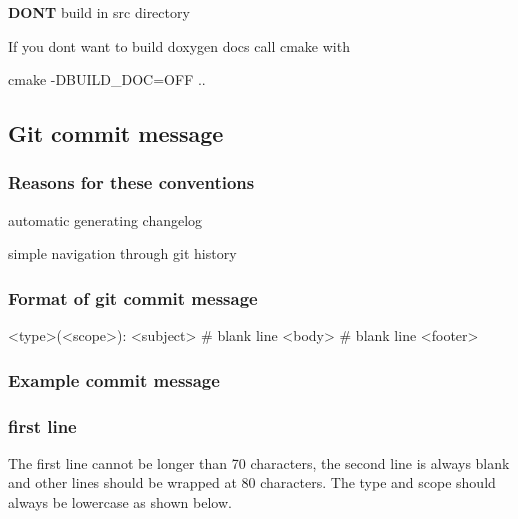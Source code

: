 {\bfseries D\+O\+NT} build in {\ttfamily src} directory
\begin{DoxyItemize}
\item If you dont want to build {\ttfamily doxygen docs} call cmake with
\end{DoxyItemize}


\begin{DoxyCode}
cmake -DBUILD\_DOC=OFF ..
\end{DoxyCode}


\subsection*{Git commit message}

\subsubsection*{Reasons for these conventions}


\begin{DoxyItemize}
\item automatic generating changelog
\item simple navigation through git history
\end{DoxyItemize}

\subsubsection*{Format of git commit message}


\begin{DoxyCode}
<type>(<scope>): <subject>
# blank line
<body>
# blank line
<footer>
\end{DoxyCode}


\subsubsection*{Example commit message}




\subsubsection*{first line}

The first line cannot be longer than 70 characters, the second line is always blank and other lines should be wrapped at 80 characters. The type and scope should always be lowercase as shown below.


